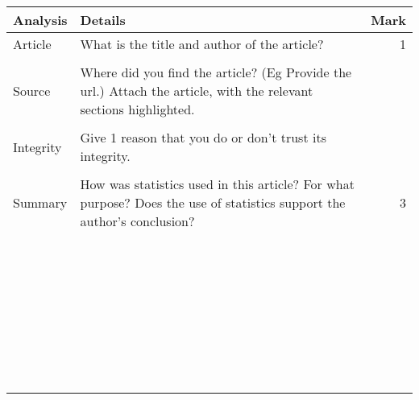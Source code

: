 \documentclass[bigtut]{quiz}\usepackage[]{graphicx}\usepackage[]{color}
\begin{document}
\begin{tutorial}
\begin{tabular}{|l|l|r|} \hline
{\bf Analysis} & {\bf Details} \hspace{11cm} & {\bf Mark} \\ \hline
Article & {\tiny What is the title and author of the article?} & 1  \\
& & \\ 
Source & {\tiny Where did you find the article? (Eg Provide the url.) Attach the article, with the relevant sections highlighted.} \hspace{.5cm} &  \\ 
& & \\ 
Integrity &  {\tiny Give 1 reason that you do or don't trust its integrity.} &   \\ 
& & \\ \hline
Summary & {\tiny How was statistics used in this article? For what purpose? Does the use of statistics support the author's conclusion?} & 3 \\
&  & \\ 
& & \\ 
& & \\ 
& & \\ 
& & \\  
& & \\ 
& & \\ 
& & \\  
& & \\
& & \\ 
& & \\ 
& & \\ 
& & \\ 
& & \\ 
& & \\ 
& & \\ 
& & \\ 
& & \\ 
& & \\ 
& & \\ 
& & \\ 
& & \\ 
& & \\ 
& & \\ 
& & \\ 
& & \\ 
& & \\ 
& & \\
& & \\ 
& & \\ 
& & \\ 
& & \\ 
& & \\ 

\end{tabular}
\end{tutorial}
\end{document}
